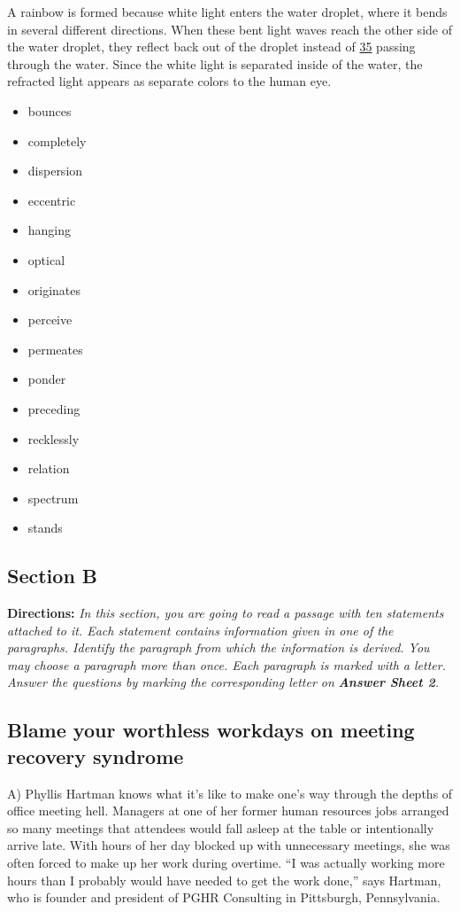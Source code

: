 \documentclass[UTF8,11pt]{ctexart}
\begin{document}
A rainbow is formed because white light enters the water droplet, where it bends in several different directions. When these bent light waves reach the other side of the water droplet, they reflect back out of the droplet instead of \uline{35} passing through the water. Since the white light is separated inside of the water, the refracted light appears as separate colors to the human eye.


\begin{itemize}[leftmargin=2em,itemsep=.2em,topsep=.4em]\item[A.] bounces
\item[B.] completely
\item[C.] dispersion
\item[D.] eccentric
\item[E.] hanging
\item[F.] optical
\item[G.] originates
\item[H.] perceive
\item[I.] permeates
\item[J.] ponder
\item[K.] preceding
\item[L.] recklessly
\item[M.] relation
\item[N.] spectrum
\item[O.] stands
\end{itemize}

\subsection*{\textbf{Section B}}


\textbf{Directions:} \textit{In this section, you are going to read a passage with ten statements attached to it. Each statement contains} \textit{information given in one of the paragraphs. Identify the paragraph from which the information is derived. You may} \textit{choose a paragraph more than once. Each paragraph is marked with a letter. Answer the questions by marking the} \textit{corresponding letter on }\textbf{\textit{Answer Sheet 2}}\textit{.}


\subsection*{\textbf{Blame your worthless workdays on meeting recovery syndrome}}


A) Phyllis Hartman knows what it’s like to make one’s way through the depths of office meeting hell. Managers at one of her former human resources jobs arranged so many meetings that attendees would fall asleep at the table or intentionally arrive late. With hours of her day blocked up with unnecessary meetings, she was often forced to make up her work during overtime. “I was actually working more hours than I probably would have needed to get the work done,” says Hartman, who is founder and president of PGHR Consulting in Pittsburgh, Pennsylvania.
\end{document}
